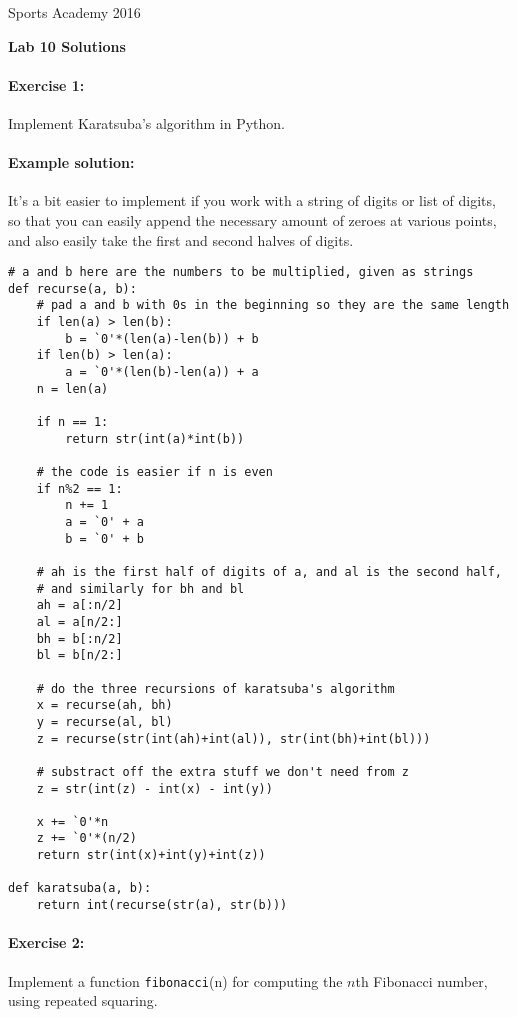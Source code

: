 \documentclass[11pt]{article}
\newlength{\toppush}
\newcommand{\htitle}[2]{\noindent\vspace*{-\toppush}\newline\parbox{6.5in}
 {\large Sports Academy \hfill #1\newline
\hspace*{\fill}{\bf Algorithms and Programming for High Schoolers} \hspace*{\fill} \newline
\mbox{}\hrulefill\mbox{}}\vspace*{1ex}\mbox{}\newline
\begin{center}{\Large\bf #2}\end{center}}
\begin{document}
\htitle{2016}{Lab 10 Solutions}

\paragraph{Exercise 1:}
Implement Karatsuba's algorithm in Python.

\paragraph{Example solution:}
It's a bit easier to implement if you work with a string of digits or
list of digits, so that you can easily append the necessary amount of
zeroes at various points, and also easily take the first and second
halves of digits.

\begin{verbatim}
# a and b here are the numbers to be multiplied, given as strings
def recurse(a, b):
    # pad a and b with 0s in the beginning so they are the same length
    if len(a) > len(b):
        b = `0'*(len(a)-len(b)) + b
    if len(b) > len(a):
        a = `0'*(len(b)-len(a)) + a
    n = len(a)

    if n == 1:
        return str(int(a)*int(b))

    # the code is easier if n is even
    if n%2 == 1:
        n += 1
        a = `0' + a
        b = `0' + b

    # ah is the first half of digits of a, and al is the second half,
    # and similarly for bh and bl
    ah = a[:n/2]
    al = a[n/2:]
    bh = b[:n/2]
    bl = b[n/2:]

    # do the three recursions of karatsuba's algorithm
    x = recurse(ah, bh)
    y = recurse(al, bl)
    z = recurse(str(int(ah)+int(al)), str(int(bh)+int(bl)))

    # substract off the extra stuff we don't need from z
    z = str(int(z) - int(x) - int(y))

    x += `0'*n
    z += `0'*(n/2)
    return str(int(x)+int(y)+int(z))

def karatsuba(a, b):
    return int(recurse(str(a), str(b)))
\end{verbatim}

\paragraph{Exercise 2:}
Implement a function \texttt{fibonacci}(n) for computing the $n$th
Fibonacci number, using repeated squaring.
\end{document}
